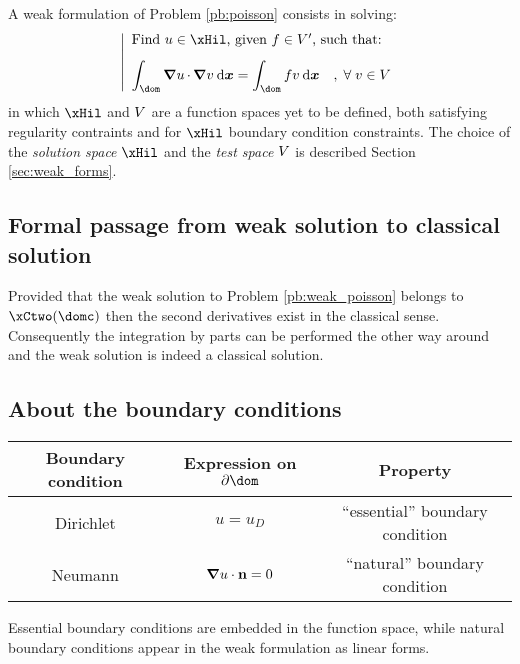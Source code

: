 \medskip
A weak formulation of Problem \eqref{pb:poisson} consists in solving:
\begin{equation}\label{pb:weak_poisson}
\left\lvert
\begin{array}{ll}
\mbox{Find $u \in \xHil$, given $f \in \xV'$, such that:}\\[2ex]
\displaystyle\int_\dom \Grad u\xDot \Grad v\dx = \int_\dom f v  \dx\quad,\;\forany  v\in \xV
\end{array}
\right .
\end{equation}
in which $\xHil$ and ${V}$ are a function spaces yet to be defined, both satisfying regularity contraints and for $\xHil$ boundary condition constraints.
The choice of the \textit{solution space} $\xHil$ and the \textit{test space} ${V}$ is described Section \ref{sec:weak_forms}.

\subsection{Formal passage from weak solution to classical solution}

Provided that the weak solution to Problem \eqref{pb:weak_poisson} belongs to $\xCtwo(\domc)$ then the second derivatives exist in the classical sense.
Consequently the integration by parts can be performed the other way around and the weak solution is indeed a classical solution.

\subsection{About the boundary conditions}\label{sssec:bcs}

\begin{center}
\begin{tabular}[width=0.5\textwidth]{|c|c|c|}
\hline
Boundary condition & Expression on $\partial\dom$ & Property \\
\hline
\hline
Dirichlet     & $u = u_D$             & ``essential'' boundary condition \\
Neumann       & ${\boldsymbol\nabla} u\cdot\mathbf n = 0$ &  ``natural'' boundary condition  \\
\hline
\end{tabular}
\end{center}

Essential boundary conditions are embedded in the function space, while natural boundary conditions appear in the weak formulation as linear forms.

